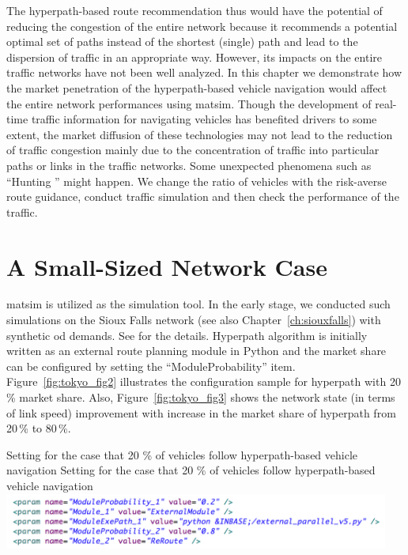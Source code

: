 The hyperpath-based route recommendation thus would have the potential of reducing the congestion of the entire network because it recommends a potential optimal set of paths instead of the shortest (single) path and lead to the dispersion of traffic in an appropriate way. However, its impacts on the entire traffic networks have not been well analyzed. In this chapter we demonstrate how the market penetration of the hyperpath-based vehicle navigation would affect the entire network performances using \gls{matsim}.  Though the development of real-time traffic information for navigating vehicles has benefited drivers to some extent, the market diffusion of these technologies may not lead to the reduction of traffic congestion mainly due to the concentration of traffic into particular paths or links in the traffic networks. Some unexpected phenomena such as ``Hunting \citep[e.g.,][]{Oguchi2003}'' might happen. We change the ratio of vehicles with the risk-averse route guidance, conduct traffic simulation and then check the performance of the traffic.


\section{A Small-Sized Network Case}

\gls{matsim} is utilized as the simulation tool. In the early stage, we conducted such simulations on the Sioux Falls network (see also Chapter~\ref{ch:siouxfalls}) with synthetic \gls{od} demands. See \citep{Yamada2013} for the details. Hyperpath algorithm is initially written as an external route planning module in Python and the market share can be configured by setting the ``ModuleProbability'' item. Figure~\ref{fig:tokyo_fig2} illustrates the configuration sample for hyperpath with 20\,\% market share. Also, Figure~\ref{fig:tokyo_fig3} shows the network state (in terms of link speed) improvement with increase in the market share of hyperpath from 20\,\% to 80\,\%.

\createfigure%
{Setting for the case that 20 \% of vehicles follow hyperpath-based vehicle navigation}%
{Setting for the case that 20 \% of vehicles follow hyperpath-based vehicle navigation}%
{\label{fig:tokyo_fig2}}%
{\includegraphics[width=0.95\textwidth, angle=0]{./scenarios/figures/tokyo_fig2.png}}%
{}

